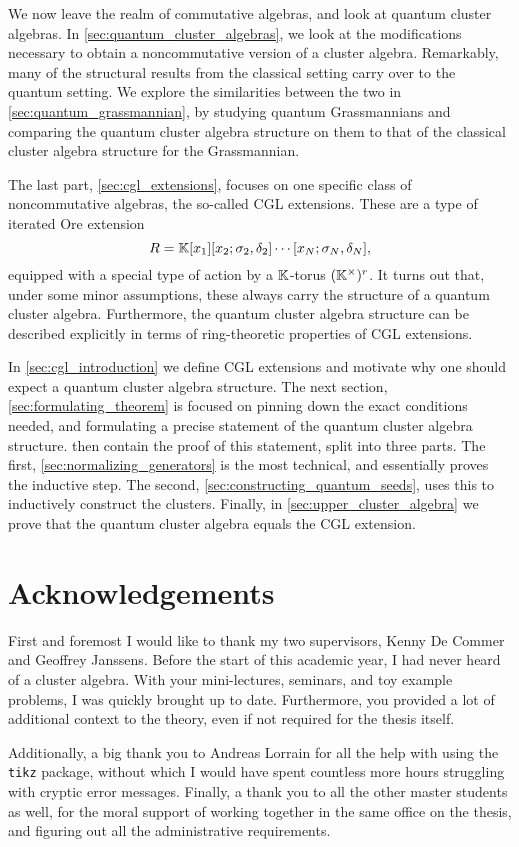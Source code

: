 \medskip

We now leave the realm of commutative algebras, and look at quantum cluster algebras.
In \cref{sec:quantum_cluster_algebras}, we look at the modifications necessary to
obtain a noncommutative version of a cluster algebra. Remarkably, many of the
structural results from the classical setting carry over to the quantum setting. We
explore the similarities between the two in \cref{sec:quantum_grassmannian}, by
studying quantum Grassmannians and comparing the quantum cluster algebra structure on
them to that of the classical cluster algebra structure for the Grassmannian.

\medskip

The last part, \cref{sec:cgl_extensions}, focuses on one specific class of
noncommutative algebras, the so-called CGL extensions. These are a type of iterated Ore
extension
\begin{equation*}
	R = \mathbb{K}[x_1][x_2; \sigma_2, \delta_2]\cdots[x_N; \sigma_N, \delta_N],
\end{equation*}
%
equipped with a special type of action by a $\mathbb{K}$-torus $(\mathbb{K}^\times)^r$. It turns
out that, under some minor assumptions, these always carry the structure of a quantum
cluster algebra. Furthermore, the quantum cluster algebra structure can be described
explicitly in terms of ring-theoretic properties of CGL extensions.

In \cref{sec:cgl_introduction} we define CGL extensions and motivate why one should
expect a quantum cluster algebra structure. The next section,
\cref{sec:formulating_theorem} is focused on pinning down the exact conditions needed,
and formulating a precise statement of the quantum cluster algebra structure.
then contain the proof of this statement, split into three parts. The first,
\cref{sec:normalizing_generators} is the most technical, and essentially proves the
inductive step. The second, \cref{sec:constructing_quantum_seeds}, uses this to
inductively construct the clusters. Finally, in \cref{sec:upper_cluster_algebra} we
prove that the quantum cluster algebra equals the CGL extension.

\section*{Acknowledgements}

First and foremost I would like to thank my two supervisors, Kenny De Commer and
Geoffrey Janssens. Before the start of this academic year, I had never heard of a
cluster algebra. With your mini-lectures, seminars, and toy example problems, I was
quickly brought up to date. Furthermore, you provided a lot of additional context to
the theory, even if not required for the thesis itself.

Additionally, a big thank you to Andreas Lorrain for all the help with using the
\texttt{tikz} package, without which I would have spent countless more hours struggling
with cryptic error messages. Finally, a thank you to all the other master students as
well, for the moral support of working together in the same office on the thesis, and
figuring out all the administrative requirements.
